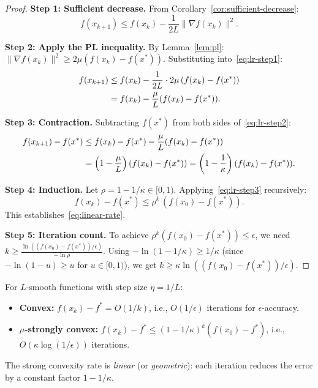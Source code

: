 \documentclass[11pt,a4paper]{article}
\begin{document}
\begin{proof}
\textbf{Step 1: Sufficient decrease.}
From Corollary~\ref{cor:sufficient-decrease}:
\begin{equation}\label{eq:lr-step1}
  f(x_{k+1}) \le f(x_k) - \frac{1}{2L}\|\nabla f(x_k)\|^2.
\end{equation}

\textbf{Step 2: Apply the PL inequality.}
By Lemma~\ref{lem:pl}: $\|\nabla f(x_k)\|^2 \ge 2\mu(f(x_k) - f(x^*))$.
Substituting into~\eqref{eq:lr-step1}:
\begin{align}
  f(x_{k+1}) &\le f(x_k) - \frac{1}{2L} \cdot 2\mu\, (f(x_k) - f(x^*))
  \notag \\
  &= f(x_k) - \frac{\mu}{L}(f(x_k) - f(x^*)). \label{eq:lr-step2}
\end{align}

\textbf{Step 3: Contraction.}
Subtracting $f(x^*)$ from both sides of~\eqref{eq:lr-step2}:
\begin{align}
  f(x_{k+1}) - f(x^*) &\le f(x_k) - f(x^*) - \frac{\mu}{L}(f(x_k) - f(x^*))
  \notag \\
  &= \left(1 - \frac{\mu}{L}\right)(f(x_k) - f(x^*))
  = \left(1 - \frac{1}{\kappa}\right)(f(x_k) - f(x^*)). \label{eq:lr-step3}
\end{align}

\textbf{Step 4: Induction.}
Let $\rho = 1 - 1/\kappa \in [0, 1)$. Applying~\eqref{eq:lr-step3}
recursively:
\begin{equation}\label{eq:lr-induction}
  f(x_k) - f(x^*) \le \rho^k\, (f(x_0) - f(x^*)).
\end{equation}
This establishes~\eqref{eq:linear-rate}.

\textbf{Step 5: Iteration count.}
To achieve $\rho^k (f(x_0) - f(x^*)) \le \epsilon$, we need
$k \ge \frac{\ln((f(x_0) - f(x^*))/\epsilon)}{-\ln \rho}$. Using
$-\ln(1 - 1/\kappa) \ge 1/\kappa$ (since $-\ln(1-u) \ge u$ for
$u \in [0,1)$), we get $k \ge \kappa \ln((f(x_0) - f(x^*))/\epsilon)$.
\end{proof}

\begin{keyresult}[title={Gradient Descent Convergence Summary}]
For $L$-smooth functions with step size $\eta = 1/L$:
\begin{itemize}
  \item \textbf{Convex:} $f(x_k) - f^* = O(1/k)$, i.e., $O(1/\epsilon)$
    iterations for $\epsilon$-accuracy.
  \item \textbf{$\mu$-strongly convex:} $f(x_k) - f^* \le (1 - 1/\kappa)^k
    (f(x_0) - f^*)$, i.e., $O(\kappa \log(1/\epsilon))$ iterations.
\end{itemize}
The strong convexity rate is \emph{linear} (or \emph{geometric}): each
iteration reduces the error by a constant factor $1 - 1/\kappa$.
\end{keyresult}
\end{document}
